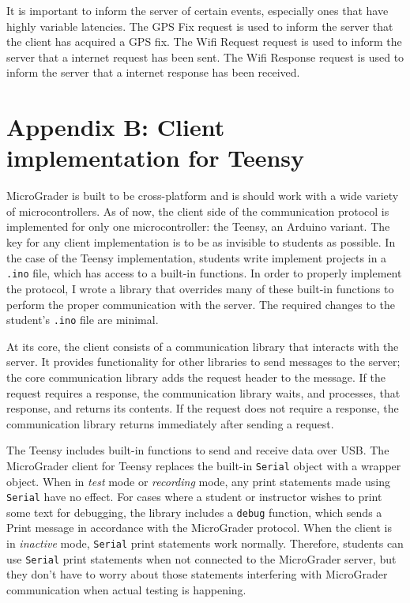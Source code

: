 \documentclass[12pt]{article}
\begin{document}
It is important to inform the server of certain events, especially ones that have highly variable latencies.  The GPS Fix request is used to inform the server that the client has acquired a GPS fix.  The Wifi Request request is used to inform the server that a internet request has been sent.  The Wifi Response request is used to inform the server that a internet response has been received.

\newpage
\section{Appendix B: Client implementation for Teensy}
\label{sec:teensy}
MicroGrader is built to be cross-platform and is should work with a wide variety of microcontrollers.  As of now, the client side of the communication protocol is implemented for only one microcontroller: the Teensy, an Arduino variant.  The key for any client implementation is to be as invisible to students as possible.  In the case of the Teensy implementation, students write implement projects in a \texttt{.ino} file, which has access to a built-in functions.  In order to properly implement the protocol, I wrote a library that overrides many of these built-in functions to perform the proper communication with the server.  The required changes to the student's \texttt{.ino} file are minimal.

At its core, the client consists of a communication library that interacts with the server.  It provides functionality for other libraries to send messages to the server; the core communication library adds the request header to the message.  If the request requires a response, the communication library waits, and processes, that response, and returns its contents.  If the request does not require a response, the communication library returns immediately after sending a request.

The Teensy includes built-in functions to send and receive data over USB.  The MicroGrader client for Teensy replaces the built-in \texttt{Serial} object with a wrapper object.  When in \textit{test} mode or \textit{recording} mode, any print statements made using \texttt{Serial} have no effect.  For cases where a student or instructor wishes to print some text for debugging, the library includes a \texttt{debug} function, which sends a Print message in accordance with the MicroGrader protocol.  When the client is in \textit{inactive} mode, \texttt{Serial} print statements work normally.  Therefore, students can use \texttt{Serial} print statements when not connected to the MicroGrader server, but they don't have to worry about those statements interfering with MicroGrader communication when actual testing is happening.
\end{document}
